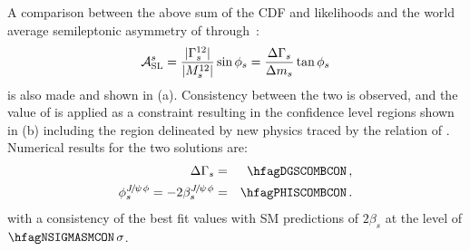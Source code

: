 {A comparison between
the above sum of the
CDF and \dzero likelihoods 
and the world average \Bs semileptonic asymmetry of
 through~\cite{Beneke:2003az}:
\begin{equation}
{\cal A}_{\rm SL}^s = 
\frac{|\Gamma^{12}_s|}{|M^{12}_s|}\sin\phi_s = \frac{\Delta\Gamma_{s}}{\Delta m_{s}}\tan\phi_s
\end{equation}
is also made and shown in 
(a).
Consistency between the two is observed, and the value
of \ASLs is applied as a constraint
resulting in the
confidence level regions 
shown in (b)
including the region delineated by new physics traced by 
the relation of . Numerical results for the 
two solutions are:
\begin{eqnarray}
\DGs &=& \hfagDGSCOMBCON \,, \\
\phi_s^{\jpsi\phi} = -2\beta_s^{\jpsi\phi} &=& \hfagPHISCOMBCON \,.
\end{eqnarray}
with a consistency
of the best fit values with
SM predictions of $2\beta_s$ at the level of $\hfagNSIGMASMCON\,\sigma$.


}


